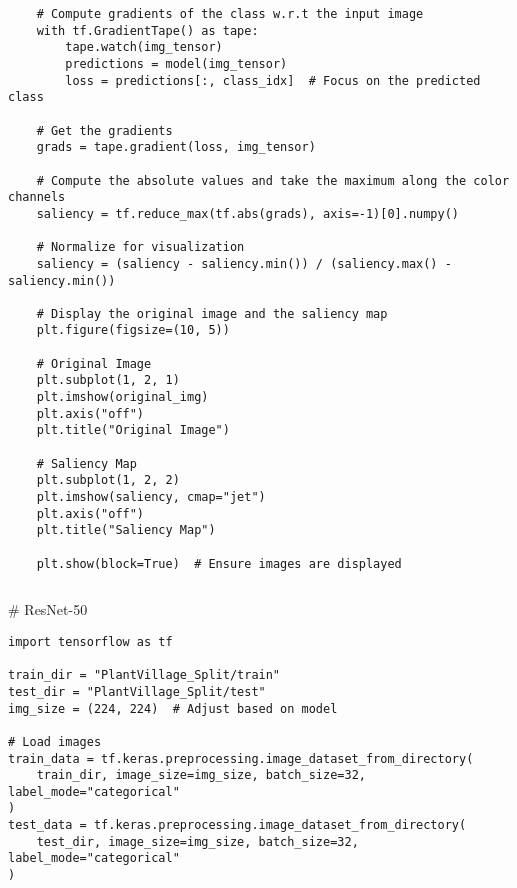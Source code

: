 \documentclass{article}
\begin{document}
\begin{lstlisting}
    # Compute gradients of the class w.r.t the input image
    with tf.GradientTape() as tape:
        tape.watch(img_tensor)
        predictions = model(img_tensor)
        loss = predictions[:, class_idx]  # Focus on the predicted class

    # Get the gradients
    grads = tape.gradient(loss, img_tensor)

    # Compute the absolute values and take the maximum along the color channels
    saliency = tf.reduce_max(tf.abs(grads), axis=-1)[0].numpy()

    # Normalize for visualization
    saliency = (saliency - saliency.min()) / (saliency.max() - saliency.min())

    # Display the original image and the saliency map
    plt.figure(figsize=(10, 5))

    # Original Image
    plt.subplot(1, 2, 1)
    plt.imshow(original_img)
    plt.axis("off")
    plt.title("Original Image")

    # Saliency Map
    plt.subplot(1, 2, 2)
    plt.imshow(saliency, cmap="jet")
    plt.axis("off")
    plt.title("Saliency Map")

    plt.show(block=True)  # Ensure images are displayed
\end{lstlisting}
\begin{lstlisting}

\end{lstlisting}
# ResNet-50
\begin{lstlisting}
import tensorflow as tf

train_dir = "PlantVillage_Split/train"
test_dir = "PlantVillage_Split/test"
img_size = (224, 224)  # Adjust based on model

# Load images
train_data = tf.keras.preprocessing.image_dataset_from_directory(
    train_dir, image_size=img_size, batch_size=32, label_mode="categorical"
)
test_data = tf.keras.preprocessing.image_dataset_from_directory(
    test_dir, image_size=img_size, batch_size=32, label_mode="categorical"
)
\end{lstlisting}
\end{document}
